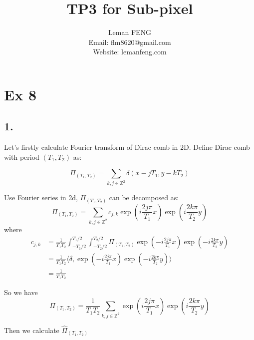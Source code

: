 \documentclass{article}
\title{TP3 for Sub-pixel}
\author{Leman FENG\\ Email: flm8620@gmail.com\\Website: lemanfeng.com}
\begin{document}
	\maketitle
	\section{Ex 8}
	\subsection{1.}
	Let's firstly calculate Fourier transform of Dirac comb in 2D. Define Dirac comb with period $(T_1,T_2)$ as:
	
	\begin{equation}
	\Pi_{(T_1,T_2)} = \sum_{k,j\in \mathbb{Z}^2} \delta(x-jT_1,y-kT_2)
	\end{equation}
	
	Use Fourier series in 2d, $\Pi_{(T_1,T_2)}$ can be decomposed as:
	\begin{equation}
	\Pi_{(T_1,T_2)} = \sum_{k,j\in \mathbb{Z}^2} c_{j,k} \exp(i \frac{2j\pi}{T_1}x)  \exp(i \frac{2k\pi}{T_2}y)
	\end{equation}
	where
	\begin{equation}
	\begin{split}
	c_{j,k} &= \frac{1}{T_1T_2} \int_{-T_1/2}^{T_1/2} \int_{-T_2/2}^{T_2/2} \Pi_{(T_1,T_2)} \exp(-i\frac{2j\pi}{T_1}x)  \exp(-i\frac{2k\pi}{T_2}y) \\
	&= \frac{1}{T_1T_2} \langle \delta,\exp(-i\frac{2j\pi}{T_1}x)  \exp(-i\frac{2k\pi}{T_2}y)  \rangle\\
	&= \frac{1}{T_1T_2}
	\end{split}
	\end{equation}
	
	So we have 
	\begin{equation}
	\Pi_{(T_1,T_2)} = \frac{1}{T_1T_2} \sum_{k,j\in \mathbb{Z}^2} \exp(i \frac{2j\pi}{T_1}x)  \exp(i \frac{2k\pi}{T_2}y)
	\end{equation}
	
	Then we calculate $\hat{\Pi}_{(T_1,T_2)}$
	
\end{document}
